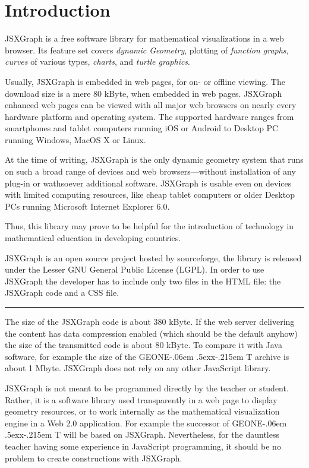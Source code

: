 \documentclass[12pt,a4paper]{article}%
\def\GEONExT{GEONE\kern-.06em \lower.5ex\hbox{x}\kern-.215em T}
\begin{document}
\section{Introduction}
JSXGraph is a free software library for mathematical visualizations in a web browser.
Its feature set covers {\sl dynamic Geometry}, plotting of {\sl function graphs}, 
{\sl curves} of various types, {\sl charts}, and {\sl turtle graphics}.

Usually, JSXGraph is embedded in web pages, for on- or off\/line viewing.
The download size is a mere 80 kByte, when embedded in web pages.
JSXGraph enhanced web pages can be viewed with all major web browsers 
on nearly every hardware platform and operating system.
The supported hardware ranges from smartphones and tablet computers 
running iOS or Android  to Desktop PC running Windows, MacOS X or Linux.

At the time of writing, JSXGraph is the only dynamic geometry system that runs  
on such a broad range of  devices and web browsers---without installation of any plug-in 
or wathsoever additional software.
JSXGraph is usable even on devices with limited computing resources, like cheap tablet computers or
older Desktop PCs running Microsoft Internet Explorer 6.0. 

Thus, this library may prove to be helpful for the
introduction of technology in mathematical education in developing countries.




JSXGraph is an open source project hosted by sourceforge, 
the library is released under the Lesser GNU General Public License (LGPL). 
In order to use JSXGraph the developer has to include only two files in the 
HTML file: the JSXGraph code and a CSS file. 

\bigskip
\hrule
\bigskip

The  size 
of the JSXGraph code is about 380 kByte. If the web server delivering the 
content has data compression enabled (which should be the default anyhow) the 
size of the transmitted code is about 80 kByte. To compare it with Java software, 
for example the size of the \GEONExT{} archive is about 1 Mbyte. JSXGraph does not 
rely on any other JavaScript library.

JSXGraph is not meant to be programmed directly by the teacher or student. Rather, 
it is a software library used transparently in a web page to display geometry 
resources, or to work internally as the mathematical visualization engine in a 
Web 2.0 application. For example the successor of \GEONExT{} will be based on 
JSXGraph. Nevertheless, for the dauntless teacher having some experience in 
JavaScript programming, it should be no problem to create  constructions with 
JSXGraph.
\end{document}
